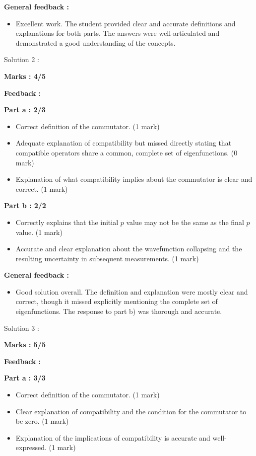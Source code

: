 \documentclass[a4paper,11pt]{article}
\begin{document}
\textbf{General feedback :}

\begin{itemize}
    \item Excellent work. The student provided clear and accurate definitions and explanations for both parts. The answers were well-articulated and demonstrated a good understanding of the concepts.
\end{itemize}


Solution 2 :

\textbf{Marks : 4/5}

\textbf{Feedback :}

\textbf{Part a : 2/3}

\begin{itemize}
    \item Correct definition of the commutator. (1 mark)
    \item Adequate explanation of compatibility but missed directly stating that compatible operators share a common, complete set of eigenfunctions. (0 mark)
    \item Explanation of what compatibility implies about the commutator is clear and correct. (1 mark)
\end{itemize}

\textbf{Part b : 2/2}

\begin{itemize}
    \item Correctly explains that the initial $p$ value may not be the same as the final $p$ value. (1 mark)
    \item Accurate and clear explanation about the wavefunction collapsing and the resulting uncertainty in subsequent measurements. (1 mark)
\end{itemize}


\textbf{General feedback :}

\begin{itemize}
    \item Good solution overall. The definition and explanation were mostly clear and correct, though it missed explicitly mentioning the complete set of eigenfunctions. The response to part b) was thorough and accurate.
\end{itemize}


Solution 3 :

\textbf{Marks : 5/5}

\textbf{Feedback : }

\textbf{Part a : 3/3}

\begin{itemize}
    \item Correct definition of the commutator. (1 mark)
    \item Clear explanation of compatibility and the condition for the commutator to be zero. (1 mark)
    \item Explanation of the implications of compatibility is accurate and well-expressed. (1 mark)
\end{itemize}
\end{document}
